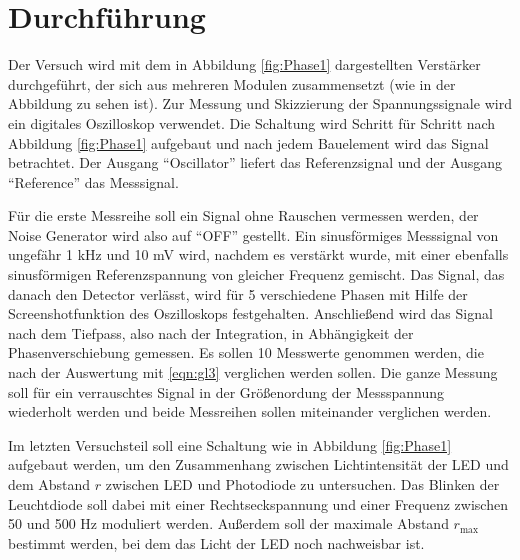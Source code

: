\section{Durchführung}
\label{sec:Durchführung}
Der Versuch wird mit dem in Abbildung \ref{fig:Phase1} dargestellten Verstärker durchgeführt, der sich aus mehreren Modulen zusammensetzt (wie in der Abbildung zu sehen ist).
Zur Messung und Skizzierung der Spannungssignale wird ein digitales Oszilloskop verwendet.
Die Schaltung wird Schritt für Schritt nach Abbildung \ref{fig:Phase1} aufgebaut und nach jedem Bauelement wird das Signal betrachtet.
Der Ausgang \enquote{Oscillator} liefert das Referenzsignal und der Ausgang \enquote{Reference} das Messsignal.

Für die erste Messreihe soll ein Signal ohne Rauschen vermessen werden, der Noise Generator wird also auf \enquote{OFF} gestellt.
Ein sinusförmiges Messsignal von ungefähr 1 kHz und 10 mV wird, nachdem es verstärkt wurde, mit einer ebenfalls sinusförmigen Referenzspannung von gleicher Frequenz gemischt.
Das Signal, das danach den Detector verlässt, wird für 5 verschiedene Phasen mit Hilfe der Screenshotfunktion des Oszilloskops festgehalten.
Anschließend wird das Signal nach dem Tiefpass, also nach der Integration, in Abhängigkeit der Phasenverschiebung gemessen.
Es sollen 10 Messwerte genommen werden, die nach der Auswertung mit \eqref{eqn:gl3} verglichen werden sollen.
Die ganze Messung soll für ein verrauschtes Signal in der Größenordung der Messspannung wiederholt werden und beide Messreihen sollen miteinander verglichen werden.

Im letzten Versuchsteil soll eine Schaltung wie in Abbildung \ref{fig:Phase1} aufgebaut werden, um den Zusammenhang zwischen Lichtintensität der LED und dem Abstand $r$ zwischen LED und Photodiode zu untersuchen.
Das Blinken der Leuchtdiode soll dabei mit einer Rechtseckspannung und einer Frequenz zwischen 50 und 500 Hz moduliert werden.
Außerdem soll der maximale Abstand $r_{\text{max}}$ bestimmt werden, bei dem das Licht der LED noch nachweisbar ist.
